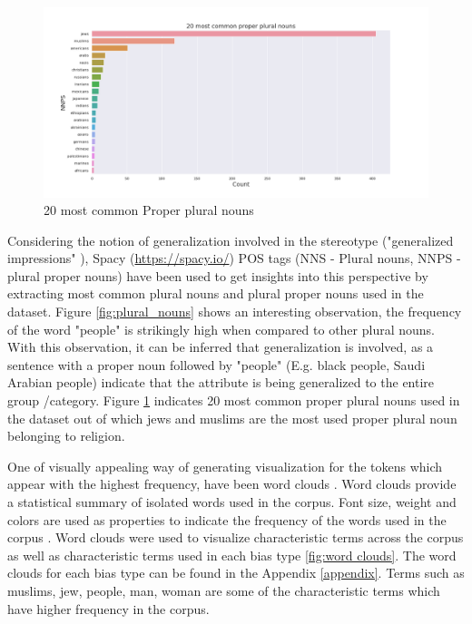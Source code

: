\begin{figure}[h!]
    \centering
    \includegraphics[width=1\textwidth]{thesis/figures/20 most common proper plural nouns.png}
    \caption{20 most common Proper plural nouns}
    \label{fig:Proper_plural_nouns}
\end{figure}
Considering the notion of generalization involved in the stereotype ("generalized impressions" \cite{burgers2020language}), Spacy (\url{https://spacy.io/}) POS tags (NNS - Plural nouns, NNPS - plural proper nouns) have been used to get insights into this perspective by extracting most common plural nouns and plural proper nouns used in the dataset. Figure \ref{fig:plural_nouns} shows an interesting observation, the frequency of the word "people" is strikingly high when compared to other plural nouns. With this observation, it can be inferred that generalization is involved, as a sentence with a proper noun followed by "people" (E.g. black people, Saudi Arabian people) indicate that the attribute is being generalized to the entire group /category. Figure \ref{fig:Proper_plural_nouns} indicates 20 most common proper plural nouns used in the dataset out of which jews and muslims are the most used proper plural noun belonging to religion.

One of visually appealing way of generating visualization for the tokens which appear with the highest frequency, have been word clouds \cite{heimerl2014word}. Word clouds provide a statistical summary of isolated words used in the corpus. Font size, weight and colors are used as properties to indicate the frequency of the words used in the corpus \cite{heimerl2014word}. Word clouds were used to visualize characteristic terms across the corpus as well as characteristic terms used in each bias type \ref{fig:word clouds}. The word clouds for each bias type can be found in the Appendix \ref{appendix}. Terms such as muslims, jew, people, man, woman are some of the characteristic terms which have higher frequency in the corpus.  

